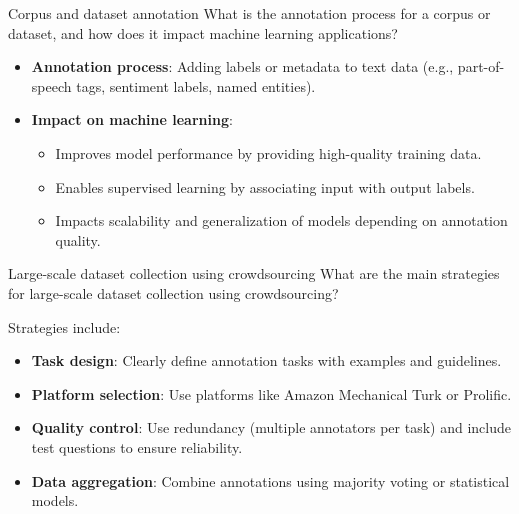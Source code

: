 \documentclass{article}
\begin{document}
\begin{exercise}{Corpus and dataset annotation}
  What is the annotation process for a corpus or dataset, and how does it impact machine learning applications?

  \begin{solution}
    \begin{itemize}
        \item \textbf{Annotation process}: Adding labels or metadata to text data (e.g., part-of-speech tags, sentiment labels, named entities).
        \item \textbf{Impact on machine learning}:
        \begin{itemize}
            \item Improves model performance by providing high-quality training data.
            \item Enables supervised learning by associating input with output labels.
            \item Impacts scalability and generalization of models depending on annotation quality.
        \end{itemize}
    \end{itemize}
  \end{solution}
\end{exercise}

\begin{exercise}{Large-scale dataset collection using crowdsourcing}
  What are the main strategies for large-scale dataset collection using crowdsourcing?

  \begin{solution}
    Strategies include:
    \begin{itemize}
        \item \textbf{Task design}: Clearly define annotation tasks with examples and guidelines.
        \item \textbf{Platform selection}: Use platforms like Amazon Mechanical Turk or Prolific.
        \item \textbf{Quality control}: Use redundancy (multiple annotators per task) and include test questions to ensure reliability.
        \item \textbf{Data aggregation}: Combine annotations using majority voting or statistical models.
    \end{itemize}
  \end{solution}
\end{exercise}

\end{document}
